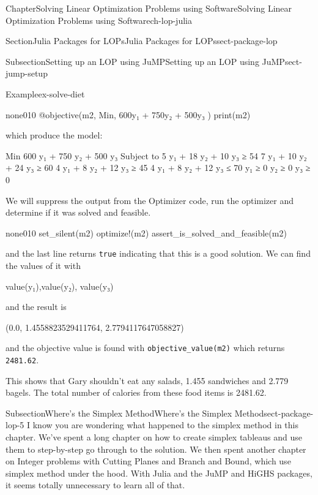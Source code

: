 \documentclass[oneside,10pt,]{book}
\newcommand{\mono}[1]{\texttt{#1}}
\numberwithin{equation}{section}
\begin{document}
\begin{chapterptx}{Chapter}{Solving Linear Optimization Problems using Software}{}{Solving Linear Optimization Problems using Software}{}{}{ch-lop-julia}
\begin{sectionptx}{Section}{Julia Packages for LOPs}{}{Julia Packages for LOPs}{}{}{sect-package-lop}
\begin{subsectionptx}{Subsection}{Setting up an LOP using JuMP}{}{Setting up an LOP using JuMP}{}{}{sect-jump-setup}
\begin{example}{Example}{}{ex-solve-diet}
\begin{programnumbered}{none}{0}{1}{0}
@objective(m2, Min, 600y₁ + 750y₂ + 500y₃ )
print(m2)
\end{programnumbered}
which produce the model:%
\par
%
\begin{codedisplay}
Min 600 y₁ + 750 y₂ + 500 y₃
Subject to
 5 y₁ + 18 y₂ + 10 y₃ ≥ 54
 7 y₁ + 10 y₂ + 24 y₃ ≥ 60
 4 y₁ + 8 y₂ + 12 y₃ ≥ 45
 4 y₁ + 8 y₂ + 12 y₃ ≤ 70
 y₁ ≥ 0
 y₂ ≥ 0
 y₃ ≥ 0
\end{codedisplay}
%
\par
We will suppress the output from the Optimizer code, run the optimizer and determine if it was solved and feasible.%
\begin{program}{none}{0}{1}{0}
set_silent(m2)
optimize!(m2)
assert_is_solved_and_feasible(m2)
\end{program}
and the last line returns \mono{true} indicating that this is a good solution. We can find the values of it with%
\par
%
\begin{codedisplay}
value(y₁),value(y₂), value(y₃)
\end{codedisplay}
%
\par
and the result is%
\par
%
\begin{codedisplay}
(0.0, 1.4558823529411764, 2.7794117647058827)
\end{codedisplay}
%
\par
and the objective value is found with \mono{objective\_value(m2)} which returns \mono{2481.62}.%
\par
This shows that Gary shouldn't eat any salads, 1.455 sandwiches and 2.779 bagels. The total number of calories from these food items is 2481.62.%
\end{example}
\end{subsectionptx}
%
%
\typeout{************************************************}
\typeout{************************************************}
%
\begin{subsectionptx}{Subsection}{Where's the Simplex Method}{}{Where's the Simplex Method}{}{}{sect-package-lop-5}
I know you are wondering what happened to the simplex method in this chapter. We've spent a long chapter on how to create simplex tableaus and use them to step-by-step go through to the solution. We then spent another chapter on Integer problems with Cutting Planes and Branch and Bound, which use simplex method under the hood. With Julia and the JuMP and HiGHS packages, it seems totally unnecessary to learn all of that.%

\end{subsectionptx}
\end{sectionptx}
\end{chapterptx}
\end{document}
